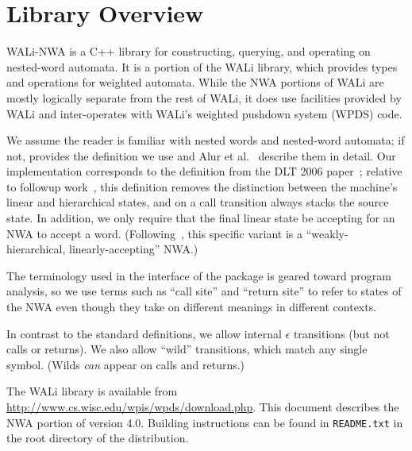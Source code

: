 \section{Library Overview}
\label{Se:Nested Word Automata}

WALi-NWA is a C++ library for constructing, querying, and operating on
nested-word automata.  It is a portion of the WALi library, which provides
types and operations for weighted automata.
While the NWA portions of WALi
are mostly logically separate from the rest of WALi, it does use
facilities provided by WALi and inter-operates with WALi's weighted pushdown
system (WPDS) code.

We assume the reader is familiar with nested words and
nested-word automata; if not,  provides the definition
we use and
Alur et al.~\cite{DLT:AM2006,JACM:AM2009} describe them in detail. Our
implementation corresponds to the definition from the DLT 2006
paper~\cite{DLT:AM2006}; relative to followup work~\cite{JACM:AM2009}, this definition removes
the distinction between the machine's linear and hierarchical states, and on
a call transition always stacks the source state. In addition, we only require that the
final linear state be accepting for an NWA to accept a
word. (Following~\cite{JACM:AM2009}, this specific variant is a
``weakly-hierarchical, linearly-accepting'' NWA.)

The terminology used in the interface of the package is geared
toward program analysis, so we use terms such as ``call site'' and ``return
site'' to refer to states of the NWA even though they take on different
meanings in different contexts.

In contrast to the standard definitions, we allow internal $\epsilon$
transitions (but not calls or returns). We also allow ``wild''
transitions, which match any single symbol. (Wilds \emph{can} appear on calls
and returns.)


The WALi library is available from
\url{http://www.cs.wisc.edu/wpis/wpds/download.php}. This document describes
the NWA portion of version 4.0. Building instructions can be found in
\texttt{README.txt} in the root directory of the distribution.

\clearpage
\tableofcontents
\clearpage

